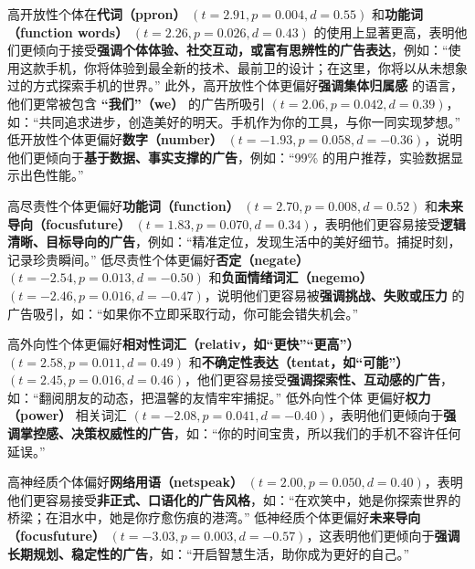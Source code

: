 高开放性个体在\textbf{代词（ppron）} \((t = 2.91, p = 0.004, d = 0.55)\) 和\textbf{功能词（function words）} \((t = 2.26, p = 0.026, d = 0.43)\) 的使用上显著更高，表明他们更倾向于接受\textbf{强调个体体验、社交互动，或富有思辨性的广告表达}，例如：“使用这款手机，你将体验到最全新的技术、最前卫的设计；在这里，你将以从未想象过的方式探索手机的世界。” 此外，高开放性个体更偏好\textbf{强调集体归属感} 的语言，他们更常被包含 \textbf{“我们”（we）} 的广告所吸引 \((t = 2.06, p = 0.042, d = 0.39)\)，如：“共同追求进步，创造美好的明天。手机作为你的工具，与你一同实现梦想。” 低开放性个体更偏好\textbf{数字（number）} \((t = -1.93, p = 0.058, d = -0.36)\)，说明他们更倾向于\textbf{基于数据、事实支撑的广告}，例如：“99\% 的用户推荐，实验数据显示出色性能。”

高尽责性个体更偏好\textbf{功能词（function）} \((t = 2.70, p = 0.008, d = 0.52)\) 和\textbf{未来导向（focusfuture）} \((t = 1.83, p = 0.070, d = 0.34)\)，表明他们更容易接受\textbf{逻辑清晰、目标导向的广告}，例如：“精准定位，发现生活中的美好细节。捕捉时刻，记录珍贵瞬间。” 低尽责性个体更偏好\textbf{否定（negate）} \((t = -2.54, p = 0.013, d = -0.50)\) 和\textbf{负面情绪词汇（negemo）} \((t = -2.46, p = 0.016, d = -0.47)\)，说明他们更容易被\textbf{强调挑战、失败或压力} 的广告吸引，如：“如果你不立即采取行动，你可能会错失机会。”

高外向性个体更偏好\textbf{相对性词汇（relativ，如“更快”“更高”）} \((t = 2.58, p = 0.011, d = 0.49)\) 和\textbf{不确定性表达（tentat，如“可能”）} \((t = 2.45, p = 0.016, d = 0.46)\)，他们更容易接受\textbf{强调探索性、互动感的广告}，如：“翻阅朋友的动态，把温馨的友情牢牢捕捉。” 低外向性个体 更偏好\textbf{权力（power）} 相关词汇 \((t = -2.08, p = 0.041, d = -0.40)\)，表明他们更倾向于\textbf{强调掌控感、决策权威性的广告}，如：“你的时间宝贵，所以我们的手机不容许任何延误。”

高神经质个体偏好\textbf{网络用语（netspeak）} \((t = 2.00, p = 0.050, d = 0.40)\)，表明他们更容易接受\textbf{非正式、口语化的广告风格}，如：“在欢笑中，她是你探索世界的桥梁；在泪水中，她是你疗愈伤痕的港湾。” 低神经质个体更偏好\textbf{未来导向（focusfuture）} \((t = -3.03, p = 0.003, d = -0.57)\)，这表明他们更倾向于\textbf{强调长期规划、稳定性的广告}，如：“开启智慧生活，助你成为更好的自己。”
